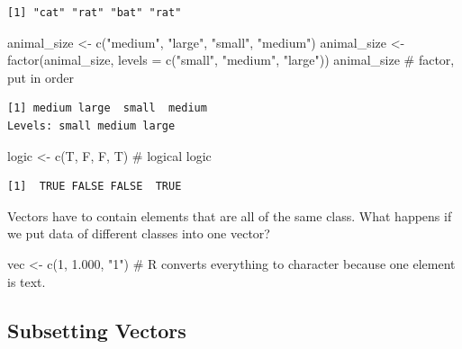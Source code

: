 \documentclass[
  letterpaper,
  DIV=11,
  numbers=noendperiod]{scrartcl}
\newenvironment{Shaded}{\begin{snugshade}}{\end{snugshade}}
\newcommand{\AttributeTok}[1]{\textcolor[rgb]{0.40,0.45,0.13}{#1}}
\newcommand{\CommentTok}[1]{\textcolor[rgb]{0.37,0.37,0.37}{#1}}
\newcommand{\DecValTok}[1]{\textcolor[rgb]{0.68,0.00,0.00}{#1}}
\newcommand{\FloatTok}[1]{\textcolor[rgb]{0.68,0.00,0.00}{#1}}
\newcommand{\FunctionTok}[1]{\textcolor[rgb]{0.28,0.35,0.67}{#1}}
\newcommand{\NormalTok}[1]{\textcolor[rgb]{0.00,0.23,0.31}{#1}}
\newcommand{\OtherTok}[1]{\textcolor[rgb]{0.00,0.23,0.31}{#1}}
\newcommand{\StringTok}[1]{\textcolor[rgb]{0.13,0.47,0.30}{#1}}
\begin{document}
\begin{verbatim}
[1] "cat" "rat" "bat" "rat"
\end{verbatim}

\begin{Shaded}
\begin{Highlighting}[]
\NormalTok{animal\_size }\OtherTok{\textless{}{-}} \FunctionTok{c}\NormalTok{(}\StringTok{"medium"}\NormalTok{, }\StringTok{"large"}\NormalTok{, }\StringTok{"small"}\NormalTok{, }\StringTok{"medium"}\NormalTok{)}
\NormalTok{animal\_size }\OtherTok{\textless{}{-}} \FunctionTok{factor}\NormalTok{(animal\_size, }\AttributeTok{levels =} \FunctionTok{c}\NormalTok{(}\StringTok{"small"}\NormalTok{, }\StringTok{"medium"}\NormalTok{, }\StringTok{"large"}\NormalTok{))}
\NormalTok{animal\_size  }\CommentTok{\# factor, put in order }
\end{Highlighting}
\end{Shaded}

\begin{verbatim}
[1] medium large  small  medium
Levels: small medium large
\end{verbatim}

\begin{Shaded}
\begin{Highlighting}[]
\NormalTok{logic }\OtherTok{\textless{}{-}} \FunctionTok{c}\NormalTok{(T, F, F, T)  }\CommentTok{\# logical}
\NormalTok{logic}
\end{Highlighting}
\end{Shaded}

\begin{verbatim}
[1]  TRUE FALSE FALSE  TRUE
\end{verbatim}

Vectors have to contain elements that are all of the same class. What
happens if we put data of different classes into one vector?

\begin{Shaded}
\begin{Highlighting}[]
\NormalTok{vec }\OtherTok{\textless{}{-}} \FunctionTok{c}\NormalTok{(}\DecValTok{1}\NormalTok{, }\FloatTok{1.000}\NormalTok{, }\StringTok{"1"}\NormalTok{)}
\CommentTok{\# R converts everything to character because one element is text.}
\end{Highlighting}
\end{Shaded}

\subsection{Subsetting Vectors}\label{subsetting-vectors}
\end{document}
